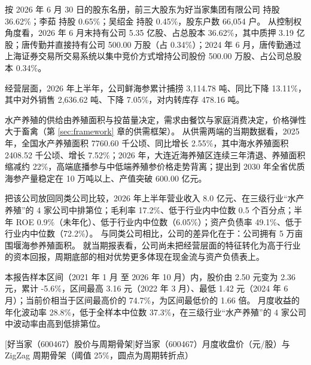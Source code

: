  按 2026 年 6 月 30 日的股东名册，前三大股东为好当家集团有限公司 持股 36.62\%；李茹 持股 0.65\%；吴绍金 持股 0.45\%，股东户数 66,054 户。 从控制权角度看，2026 年 6 月末持有公司 5.35 亿股、占总股本 36.62\%，其中质押 3.19 亿股；唐传勤并直接持有公司 500.00 万股（占 0.34\%）；2024 年 6 月，唐传勤通过上海证券交易所交易系统以集中竞价方式增持公司股份 500.00 万股、占公司总股本 0.34\%。

 经营层面，2026 年上半年，公司鲜海参累计捕捞 3,114.78 吨、同比下降 13.11\%，其中对外销售 2,636.62 吨、下降 7.05\%，对内转库存 478.16 吨。

 水产养殖的供给由养殖面积与投苗量决定，需求由餐饮与家庭消费决定，价格弹性大于畜禽（第 \ref{sec:framework} 章的供需框架）。 从供需两端的当期数据看，2025 年，全国水产养殖面积 7760.60 千公顷、同比增长 2.55\%，其中海水养殖面积 2408.52 千公顷、增长 7.52\%；2026 年，大连近海养殖区连续三年清退、养殖面积缩减约 22\%，高端底播参与中低端养殖参价格走势背离；提出到 2030 年全省优质海参产量稳定在 10 万吨以上、产值突破 600.00 亿元。

 把该公司放回同类公司比较，2026 年上半年营业收入 8.0 亿元、在三级行业“水产养殖”的 4 家公司中排第位；毛利率 17.2\%、低于行业内中位数 0.5 个百分点；半年 ROE 0.9\%（未年化）、低于行业内中位数（6.05\%）；资产负债率 49.1\%、低于行业内中位数（72.2\%）。 与同类公司相比，公司的差异化在于：公司拥有 5 万亩围堰海参养殖面积。 就当期报表看，公司尚未把经营层面的特征转化为高于行业的资本回报，周期底部的相对优势更多体现在现金流与资产负债表上。

 本报告样本区间（2021 年 1 月 至 2026 年 10 月）内，股价由 2.50 元变为 2.36 元，累计 -5.6\%，区间最高 3.16 元（2022 年 3 月）、最低 1.42 元（2024 年 6 月）；当前价相当于区间最高价的 74.7\%，为区间最低价的 1.66 倍。 月度收益的年化波动率 28.8\%，低于全样本中位数 37.3\%，在三级行业“水产养殖”的 4 家公司中波动率由高到低排第位。

\begin{center}
\begin{minipage}{\textwidth}\centering
{}

[好当家（600467）股价与周期骨架]{好当家（600467）月度收盘价（元/股）与 ZigZag 周期骨架（阈值 25\%，圆点为周期转折点）}
\end{minipage}
\end{center}

